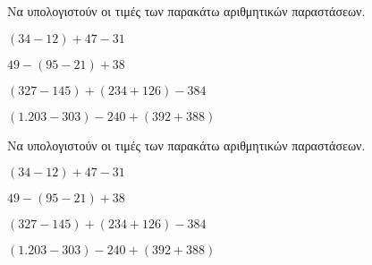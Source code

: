 Να υπολογιστούν οι τιμές των παρακάτω αριθμητικών παραστάσεων.
\begin{rlist}
\item $ (34-12)+47-31 $
\item $ 49-(95-21)+38 $
\item $ (327-145)+(234+126)-384 $
\item $ (1.203-303)-240+(392+388) $
\end{rlist}
Να υπολογιστούν οι τιμές των παρακάτω αριθμητικών παραστάσεων.
\begin{rlist}
\item $ (34-12)+47-31 $
\item $ 49-(95-21)+38 $
\item $ (327-145)+(234+126)-384 $
\item $ (1.203-303)-240+(392+388) $
\end{rlist}
